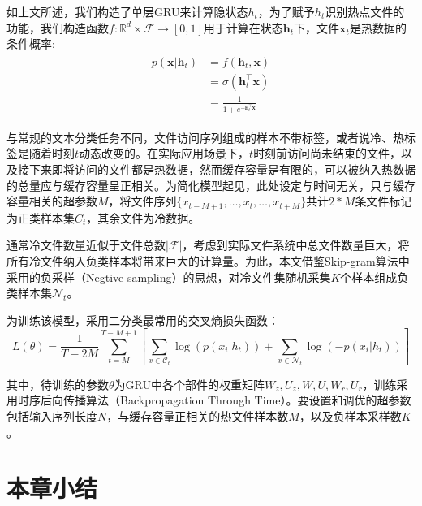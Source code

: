如上文所述，我们构造了单层GRU来计算隐状态$h_t$，为了赋予$h_t$识别热点文件的功能，我们构造函数$f:\mathbb{R}^d \times \mathcal{F} \rightarrow [0,1]$用于计算在状态$\mathbf{h}_t$下，文件$\mathbf{x}_t$是热数据的条件概率:
\begin{align}
    \begin{split}
    p(\mathbf{x} | \mathbf{h}_t) &= f(\mathbf{h}_t,\mathbf{x}) \\
                                &= \sigma(\mathbf{h}_t^{\top} \mathbf{x}) \\
                                &= \frac{1}{1+e^{-\mathbf{h}_t^{\top} \mathbf{x}}}
    \end{split}
\end{align}

与常规的文本分类任务不同，文件访问序列组成的样本不带标签，或者说冷、热标签是随着时刻$t$动态改变的。在实际应用场景下，$t$时刻前访问尚未结束的文件，以及接下来即将访问的文件都是热数据，然而缓存容量是有限的，可以被纳入热数据的总量应与缓存容量呈正相关。为简化模型起见，此处设定与时间无关，只与缓存容量相关的超参数$M$，将文件序列$\{ x_{t-M+1},\dots,x_t,\dots,x_{t+M} \}$共计$2*M$条文件标记为正类样本集$C_t$，其余文件为冷数据。

通常冷文件数量近似于文件总数$|\mathcal{F}|$，考虑到实际文件系统中总文件数量巨大，将所有冷文件纳入负类样本将带来巨大的计算量。为此，本文借鉴Skip-gram算法中采用的负采样（Negtive sampling）的思想，对冷文件集随机采集$K$个样本组成负类样本集$\mathcal{N}_t$。

为训练该模型，采用二分类最常用的交叉熵损失函数：
\begin{equation}
    L(\theta) = \frac{1}{T-2M}\sum_{t=M}^{T-M+1} \left[
        \sum_{x \in \mathcal{C}_t} \log(p(x_i | h_t)) + 
        \sum_{x \in \mathcal{N}_t} \log(-p(x_i | h_t))
    \right]
\end{equation}

其中，待训练的参数$\theta$为GRU中各个部件的权重矩阵$W_z, U_z, W, U, W_r, U_r$，训练采用时序后向传播算法（Backpropagation Through Time）。要设置和调优的超参数包括输入序列长度$N$，与缓存容量正相关的热文件样本数$M$，以及负样本采样数$K$。

\section{本章小结}